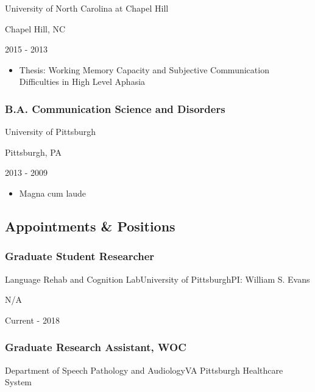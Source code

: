 \documentclass[
]{article}
\providecommand{\tightlist}{%
  \setlength{\itemsep}{0pt}\setlength{\parskip}{0pt}}
\begin{document}
University of North Carolina at Chapel Hill

Chapel Hill, NC

2015 - 2013

\begin{itemize}
\tightlist
\item
  Thesis: Working Memory Capacity and Subjective Communication\\
  Difficulties in High Level Aphasia
\end{itemize}

\hypertarget{b.a.-communication-science-and-disorders}{%
\subsubsection{B.A. Communication Science and
Disorders}\label{b.a.-communication-science-and-disorders}}

University of Pittsburgh

Pittsburgh, PA

2013 - 2009

\begin{itemize}
\tightlist
\item
  Magna cum laude
\end{itemize}

\hypertarget{appointments-positions}{%
\subsection{Appointments \& Positions}\label{appointments-positions}}

\hypertarget{graduate-student-researcher}{%
\subsubsection{Graduate Student
Researcher}\label{graduate-student-researcher}}

Language Rehab and Cognition LabUniversity of PittsburghPI: William S.
Evans

N/A

Current - 2018

\hypertarget{graduate-research-assistant-woc}{%
\subsubsection{Graduate Research Assistant,
WOC}\label{graduate-research-assistant-woc}}

Department of Speech Pathology and AudiologyVA Pittsburgh Healthcare
System
\end{document}
